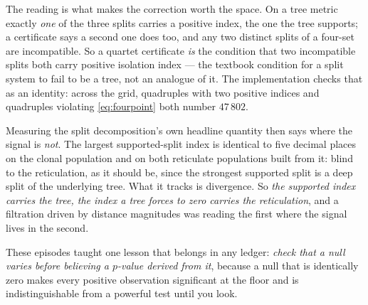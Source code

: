 \begin{ledger}
The reading is what makes the correction worth the space. On a tree metric
exactly \emph{one} of the three splits carries a positive index, the one the tree
supports; a certificate says a second one does too, and any two distinct splits
of a four-set are incompatible. So a quartet certificate \emph{is} the condition
that two incompatible splits both carry positive isolation index --- the textbook
condition for a split system to fail to be a tree, not an analogue of it. The
implementation checks that as an identity: across the grid, quadruples with two
positive indices and quadruples violating \eqref{eq:fourpoint} both number
$47\,802$.

Measuring the split decomposition's own headline quantity then says where the
signal is \emph{not}. The largest supported-split index is identical to five
decimal places on the clonal population and on both reticulate populations built
from it: blind to the reticulation, as it should be, since the strongest
supported split is a deep split of the underlying tree. What it tracks is
divergence. So \emph{the supported index carries the tree, the index a tree
forces to zero carries the reticulation}, and a filtration driven by distance
magnitudes was reading the first where the signal lives in the second.

These episodes taught one lesson that belongs in any ledger: \emph{check that a
null varies before believing a $p$-value derived from it}, because a null that is
identically zero makes every positive observation significant at the floor and is
indistinguishable from a powerful test until you look.


\end{ledger}
